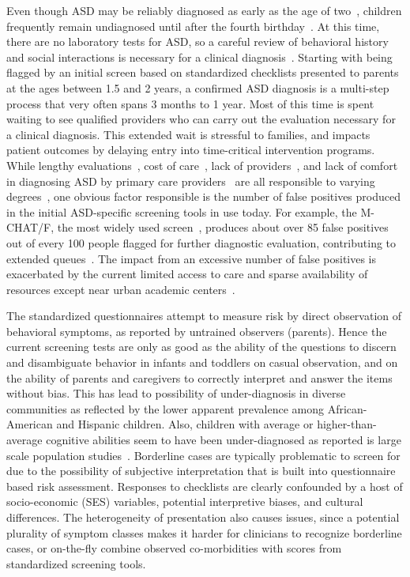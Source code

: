 \documentclass[onecolumn, compsoc,11pt]{IEEEtran}
\begin{document}
Even though ASD may be reliably diagnosed as early as the  age of two~\cite{cdc},  children frequently remain undiagnosed  until after the fourth birthday~\cite{pmid24529515}. At this time, there are no laboratory tests for ASD, so a careful review of behavioral history and social interactions is necessary for a clinical diagnosis~\cite{volkmar2014practice,hyman2020identification}.  Starting with being flagged by an  initial screen based on standardized checklists presented to parents at the ages between 1.5 and 2 years, a confirmed ASD diagnosis  is a   multi-step process that very often spans  3 months to 1 year. Most of this time is spent waiting to see qualified providers who can carry out the  evaluation necessary for a clinical diagnosis. This extended wait is stressful to families, and  impacts  patient outcomes by  delaying entry into time-critical intervention programs. While   lengthy evaluations~\cite{kalb2012determinants}, cost of care~\cite{bisgaier2011access},  lack of providers~\cite{fenikile2015barriers}, and lack of comfort in diagnosing ASD by primary care providers~\cite{fenikile2015barriers} are all responsible to varying degrees~\cite{gordon2016whittling}, one  obvious factor responsible is the number of false positives produced in the initial ASD-specific screening tools in use today. For example, the  M-CHAT/F, the most widely used screen~\cite{robins2014validation,hyman2020identification},  produces about   over 85 false positives out of every 100 people flagged for further diagnostic evaluation, contributing to extended  queues~\cite{gordon2016whittling}. 
The impact from an excessive number of false positives is exacerbated by the current  limited  access to care and sparse availability of  resources  except near urban academic centers~\cite{gordon2016whittling,althouse2006pediatric}.

The standardized questionnaires attempt to measure risk by direct observation of behavioral symptoms, as reported by untrained observers (parents). Hence the current screening  tests are only as good as the ability of the questions to discern and disambiguate behavior in infants and toddlers on casual observation, and on the ability of parents and caregivers to correctly interpret and answer the items without bias.
This has lead to possibility of  under-diagnosis in diverse communities as reflected by the
lower apparent prevalence among African-American and Hispanic children. Also, children with average or higher-than-average cognitive abilities seem to have been under-diagnosed as reported is large scale population studies~\cite{hyman2020identification}. Borderline cases are typically problematic to screen for due to the possibility  of subjective interpretation that is built into questionnaire based risk assessment. Responses to checklists are clearly confounded by a host of socio-economic (SES) variables, potential interpretive biases, and  cultural differences. The heterogeneity of presentation also causes issues, since a potential plurality of symptom classes makes it harder for clinicians  to recognize borderline cases, or on-the-fly combine observed co-morbidities with scores from  standardized screening tools. 
\end{document}
